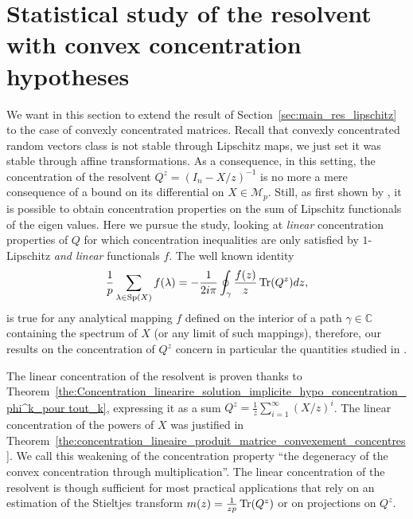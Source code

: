 \documentclass[a4papaer, titlepage]{book}
\begin{document}
\section{Statistical study of the resolvent with convex concentration hypotheses}\label{sec:resolvent_convex}

We want in this section to extend the result of Section~\ref{sec:main_res_lipschitz} to the case of convexly concentrated matrices.
Recall that convexly concentrated random vectors class is not stable through Lipschitz maps, we just set it was stable through affine transformations. 
As a consequence, in this setting, the concentration of the resolvent $Q^z = (I_n - X/z)^{-1}$ is no more a mere consequence of a bound on its differential on $X\in \mathcal{M}_{p}$. Still, as first shown by \cite{guionnet2000concentration}, it is possible to obtain concentration properties on the sum of Lipschitz functionals of the eigen values. Here we pursue the study, looking at \textit{linear} concentration properties of $Q$ for which concentration inequalities are only satisfied by $1$-Lipschitz \emph{and linear} functionals $f$. 
The well known identity
\begin{align}\label{eq:importance_stieltjes_transform}
  \frac{1}{p}\sum_{\lambda \in \text{Sp}(X)} f(\lambda) = - \frac{1}{2i\pi} \oint_\gamma \frac{f(z)}{z} \operatorname{Tr}(Q^z)dz,
\end{align}
is true for any analytical mapping $f$ defined on the interior of a path $\gamma \in \mathbb C$ containing the spectrum of $X$ (or any limit of such mappings), therefore, our results on the concentration of $Q^z$ concern in particular the quantities studied in \cite{guionnet2000concentration}.


The linear concentration of the resolvent is proven thanks to Theorem~\ref{the:Concentration_linearire_solution_implicite_hypo_concentration_phi^k_pour tout_k}, expressing it as a sum $Q^z = \frac{1}{z}\sum_{i=1}^\infty (X/z)^i$. The linear concentration of the powers of $X$ was justified in Theorem~\ref{the:concentration_lineaire_produit_matrice_convexement_concentres}. We call this weakening of the concentration property ``the degeneracy of the convex concentration through multiplication''. The linear concentration of the resolvent is though sufficient for most practical applications that rely on an estimation of the Stieltjes transform $m(z) = \frac{1}{zp} \operatorname{Tr}(Q^z)$ or on projections on $Q^z$.%
\end{document}
